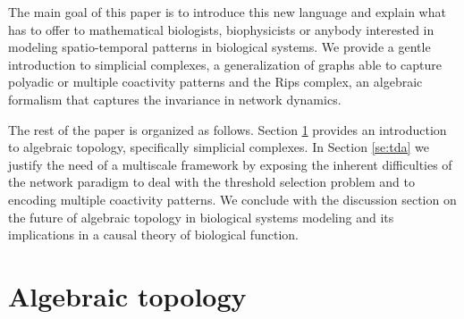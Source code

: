 \documentclass[onecollarge,runningheads]{svjour2}
\begin{document}
The main goal of this paper is to introduce this new language and explain what has to offer to mathematical biologists, biophysicists or anybody interested in modeling spatio-temporal patterns in biological systems.
We provide a gentle introduction to simplicial complexes, a generalization of graphs able to capture polyadic or multiple coactivity patterns and the Rips complex, an algebraic formalism that captures the invariance in network dynamics. 

The rest of the paper is organized as follows. Section \ref{se:at} provides an introduction to algebraic topology, specifically simplicial complexes. 
In Section \ref{se:tda} we justify the need of a multiscale framework by exposing the inherent difficulties of the network paradigm to deal with the threshold selection problem and to encoding multiple coactivity patterns.
We conclude with the discussion section on the future of algebraic topology in biological systems modeling and its implications in a causal theory of biological function.


\section{Algebraic topology}  %
\label{se:at}
\end{document}
